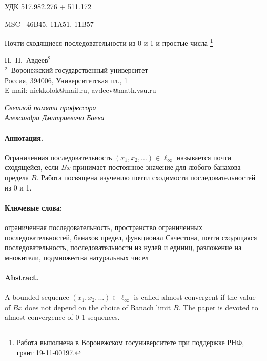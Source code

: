\documentclass[a4paper,openbib]{article}
\theoremstyle{definition}
\begin{document}
УДК  { 517.982.276 %
     + 511.172    }%

MSC~
	46B45,
	11A51,
	11B57



\begin{center}
	Почти сходящиеся последовательности из 0 и 1 и простые числа
	\footnote{
		Работа выполнена в Воронежском госуниверситете при поддержке РНФ, грант 19-11-00197.
	}
\end{center}

\begin{center}
	{Н.~Н.~Авдеев$^{2}$\\[4pt]}
	{\rm\footnotesize{$^2$\,
	Воронежский государственный университет\\
	Россия, 394006, Университетская пл., 1\\
	E-mail: nickkolok@mail.ru, avdeev@math.vsu.ru}}
\end{center}


\begin{flushright}
	\textit{
		Светлой памяти профессора \\
		Александра Дмитриевича Баева
	}
\end{flushright}


\paragraph{Аннотация.}
Ограниченная последовательность $(x_1, x_2, ...)\in \ell_\infty$
называется почти сходящейся, если
$Bx$ принимает постоянное значение
для любого банахова предела $B$.
Работа посвящена изучению почти сходимости последовательностей из 0 и 1.


\paragraph{Ключевые слова:}
	ограниченная последовательность,
	пространство ограниченных последовательностей,
	банахов предел,
	функционал Сачестона,
	почти сходящаяся последовательность,
	последовательности из нулей и единиц,
	разложение на множители,
	подмножеcтва натуральных чисел

\paragraph{Abstract.}
A bounded sequence $(x_1, x_2, ...)\in \ell_\infty$
is called almost convergent if the value of $Bx$
does not depend on the choice of Banach limit $B$.
The paper is devoted to almost convergence of 0-1-sequences.
\end{document}
